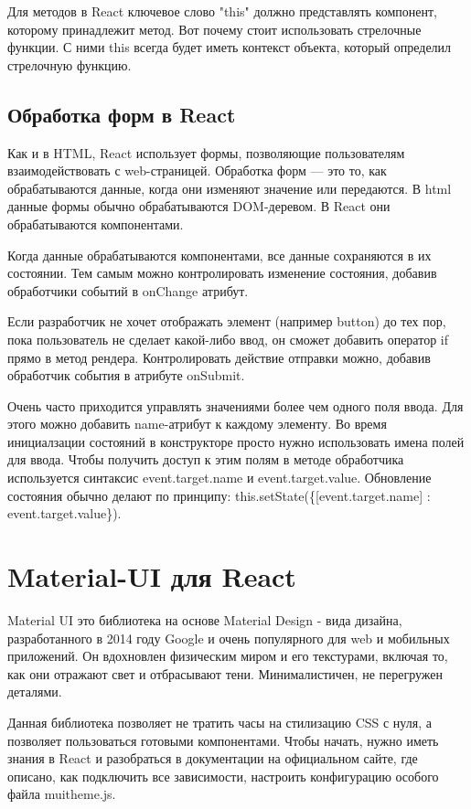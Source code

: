 \documentclass[12pt, a4paper]{diplom}
\begin{document}
Для методов в React ключевое слово "this" должно представлять компонент, которому принадлежит метод.
Вот почему стоит использовать стрелочные функции. С ними this всегда будет иметь контекст объекта, который определил стрелочную функцию.

\subsection{Обработка форм в React}

Как и в HTML, React использует формы, позволяющие пользователям взаимодействовать с web-страницей.
Обработка форм — это то, как обрабатываются данные, когда они изменяют значение или передаются.
В html данные формы обычно обрабатываются DOM-деревом. В React они обрабатываются компонентами.

Когда данные обрабатываются компонентами, все данные сохраняются в их состоянии.
Тем самым можно контролировать изменение состояния, добавив обработчики событий в onChange атрибут.

Если разработчик не хочет отображать элемент (например button) до тех пор, пока пользователь не сделает какой-либо ввод, он сможет добавить оператор if прямо в метод рендера.
Контролировать действие отправки можно, добавив обработчик события в атрибуте onSubmit.

Очень часто приходится управлять значениями более чем одного поля ввода. Для этого можно добавить name-атрибут к каждому элементу.
Во время инициалзации состояний в конструкторе просто нужно использовать имена полей для ввода.
Чтобы получить доступ к этим полям в методе обработчика используется синтаксис event.target.name и event.target.value.
Обновление состояния обычно делают по принципу: this.setState(\{[event.target.name] : event.target.value\}).

\section{Material-UI для React}

Material UI\cite{Material} это библиотека на основе Material Design - вида дизайна, разработанного в 2014 году Google и очень популярного для web и мобильных приложений.
Он вдохновлен физическим миром и его текстурами, включая то, как они отражают свет и отбрасывают тени. Минималистичен, не перегружен деталями.

Данная библиотека позволяет не тратить часы на стилизацию CSS с нуля, а позволяет пользоваться готовыми компонентами. Чтобы начать, нужно иметь знания в React и разобраться в документации на официальном сайте,
где описано, как подключить все зависимости, настроить конфигурацию особого файла muitheme.js. 
\end{document}
